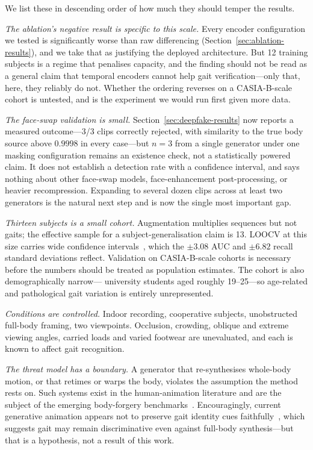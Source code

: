 \documentclass[journal]{IEEEtran}
\begin{document}
We list these in descending order of how much they should temper the results.

\emph{The ablation's negative result is specific to this scale.} Every encoder
configuration we tested is significantly worse than raw differencing
(Section~\ref{sec:ablation-results}), and we take that as justifying the
deployed architecture. But 12 training subjects is a regime that penalises
capacity, and the finding should not be read as a general claim that temporal
encoders cannot help gait verification---only that, here, they reliably do not.
Whether the ordering reverses on a CASIA-B-scale cohort is untested, and is the
experiment we would run first given more data.

\emph{The face-swap validation is small.} Section~\ref{sec:deepfake-results}
now reports a measured outcome---3/3 clips correctly rejected, with similarity
to the true body source above $0.9998$ in every case---but $n=3$ from a single
generator under one masking configuration remains an existence check, not a
statistically powered claim. It does not establish a detection rate with a
confidence interval, and says nothing about other face-swap models,
face-enhancement post-processing, or heavier recompression. Expanding to
several dozen clips across at least two generators is the natural next step
and is now the single most important gap.

\emph{Thirteen subjects is a small cohort.} Augmentation multiplies sequences
but not gaits; the effective sample for a subject-generalisation claim is 13.
LOOCV at this size carries wide confidence intervals~\cite{varoquaux_small},
which the $\pm 3.08$ AUC and $\pm 6.82$ recall standard deviations reflect.
Validation on CASIA-B-scale cohorts is necessary before the numbers should be
treated as population estimates. The cohort is also demographically narrow---%
university students aged roughly 19--25---so age-related and pathological gait
variation is entirely unrepresented.

\emph{Conditions are controlled.} Indoor recording, cooperative subjects,
unobstructed full-body framing, two viewpoints. Occlusion, crowding, oblique
and extreme viewing angles, carried loads and varied footwear are unevaluated,
and each is known to affect gait recognition.

\emph{The threat model has a boundary.} A generator that re-synthesises whole-body
motion, or that retimes or warps the body, violates the assumption the method
rests on. Such systems exist in the human-animation literature and are the
subject of the emerging body-forgery benchmarks~\cite{ttdf,humanactionclips}.
Encouragingly, current generative animation appears not to preserve gait
identity cues faithfully~\cite{gaitfidelity}, which suggests gait may remain
discriminative even against full-body synthesis---but that is a hypothesis, not
a result of this work.
\end{document}
